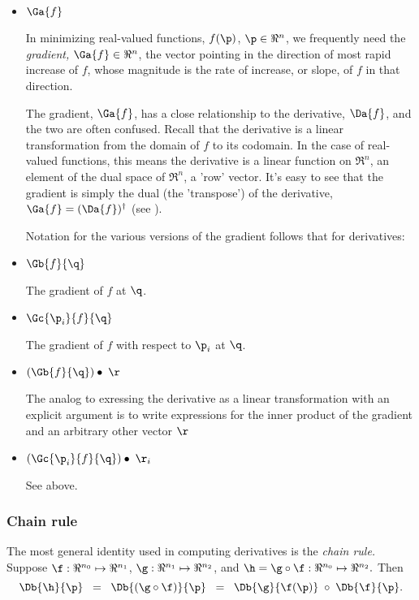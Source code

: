 \begin{itemize}

\item $\Ga{f}$

In minimizing real-valued functions, $f(\p)$, $\p \in \Re^n$,
we frequently need
the {\it gradient,} $\Ga{f} \in \Re^n$,
the vector pointing in the direction of most rapid increase of $f$,
whose magnitude is the rate of increase, or slope,
of $f$ in that direction.

The gradient, $\Ga{f}$,
has a close relationship to the derivative, $\Da{f}$,
and the two are often confused.
Recall that the derivative is a linear transformation
from the domain of $f$ to its codomain.
In the case of real-valued functions,
this means the derivative is a linear function on $\Re^n$,
an element of the dual space of $\Re^n$, a 'row' vector.
It's easy to see that the gradient is simply the dual (the 'transpose')
of the derivative, $\Ga{f} = (\Da{f})^{\dagger}$
(see \cite[p.~96, ex.~4-18]{Spivak:1965:CalculusOnManifolds}).

Notation for the various versions of the gradient
follows that for derivatives:

\item $\Gb{f}{\q}$

The gradient of $f$ at $\q$.

\item $\Gc{\p_i}{f}{\q}$

The gradient of $f$
with respect to $\p_i$ at $\q$.

\item $(\Gb{f}{\q}) \bullet \; \r$

The analog to exressing the derivative as a linear transformation
with an explicit argument is to write expressions for
the inner product of the gradient and an arbitrary other vector $\r$

\item $(\Gc{\p_i}{f}{\q}) \bullet \;\r_i$

See above.

\end{itemize}



\subsubsection{Chain rule}
\label{sec:chain}

The most general identity used in computing derivatives is the {\it chain rule.}
Suppose
$\f:\Re^{n_0} \mapsto \Re^{n_1}$,
$\g:\Re^{n_1} \mapsto \Re^{n_2}$,
and
$\h = \g \circ \f : \Re^{n_0} \mapsto \Re^{n_2}.$
Then
\begin{equation}
\label{eq:chain-rule}
\Db{\h}{\p} \;\; = \;\; \Db{(\g \circ \f)}{\p}
            \;\; = \;\; \Db{\g}{\f(\p)} \; \circ \; \Db{\f} {\p}.
\end{equation}

